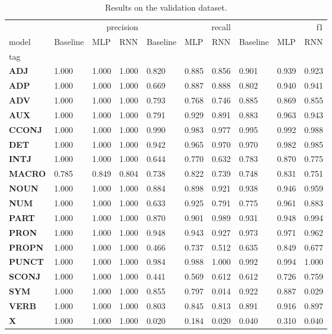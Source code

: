 \begin{table}
\caption{Results on the validation dataset.}
\label{tab::ex_2_valid}
\begin{tabular}{|l||l||l||l||l||l||l||l||l||l|}
\toprule
 & \multicolumn{3}{r}{precision} & \multicolumn{3}{r}{recall} & \multicolumn{3}{r}{f1} \\
model & Baseline & MLP & RNN & Baseline & MLP & RNN & Baseline & MLP & RNN \\
tag &  &  &  &  &  &  &  &  &  \\
\midrule
\textbf{ADJ} & 1.000 & 1.000 & 1.000 & 0.820 & 0.885 & 0.856 & 0.901 & 0.939 & 0.923 \\
\textbf{ADP} & 1.000 & 1.000 & 1.000 & 0.669 & 0.887 & 0.888 & 0.802 & 0.940 & 0.941 \\
\textbf{ADV} & 1.000 & 1.000 & 1.000 & 0.793 & 0.768 & 0.746 & 0.885 & 0.869 & 0.855 \\
\textbf{AUX} & 1.000 & 1.000 & 1.000 & 0.791 & 0.929 & 0.891 & 0.883 & 0.963 & 0.943 \\
\textbf{CCONJ} & 1.000 & 1.000 & 1.000 & 0.990 & 0.983 & 0.977 & 0.995 & 0.992 & 0.988 \\
\textbf{DET} & 1.000 & 1.000 & 1.000 & 0.942 & 0.965 & 0.970 & 0.970 & 0.982 & 0.985 \\
\textbf{INTJ} & 1.000 & 1.000 & 1.000 & 0.644 & 0.770 & 0.632 & 0.783 & 0.870 & 0.775 \\
\textbf{MACRO} & 0.785 & 0.849 & 0.804 & 0.738 & 0.822 & 0.739 & 0.748 & 0.831 & 0.751 \\
\textbf{NOUN} & 1.000 & 1.000 & 1.000 & 0.884 & 0.898 & 0.921 & 0.938 & 0.946 & 0.959 \\
\textbf{NUM} & 1.000 & 1.000 & 1.000 & 0.633 & 0.925 & 0.791 & 0.775 & 0.961 & 0.883 \\
\textbf{PART} & 1.000 & 1.000 & 1.000 & 0.870 & 0.901 & 0.989 & 0.931 & 0.948 & 0.994 \\
\textbf{PRON} & 1.000 & 1.000 & 1.000 & 0.948 & 0.943 & 0.927 & 0.973 & 0.971 & 0.962 \\
\textbf{PROPN} & 1.000 & 1.000 & 1.000 & 0.466 & 0.737 & 0.512 & 0.635 & 0.849 & 0.677 \\
\textbf{PUNCT} & 1.000 & 1.000 & 1.000 & 0.984 & 0.988 & 1.000 & 0.992 & 0.994 & 1.000 \\
\textbf{SCONJ} & 1.000 & 1.000 & 1.000 & 0.441 & 0.569 & 0.612 & 0.612 & 0.726 & 0.759 \\
\textbf{SYM} & 1.000 & 1.000 & 1.000 & 0.855 & 0.797 & 0.014 & 0.922 & 0.887 & 0.029 \\
\textbf{VERB} & 1.000 & 1.000 & 1.000 & 0.803 & 0.845 & 0.813 & 0.891 & 0.916 & 0.897 \\
\textbf{X} & 1.000 & 1.000 & 1.000 & 0.020 & 0.184 & 0.020 & 0.040 & 0.310 & 0.040 \\
\bottomrule
\end{tabular}
\end{table}

